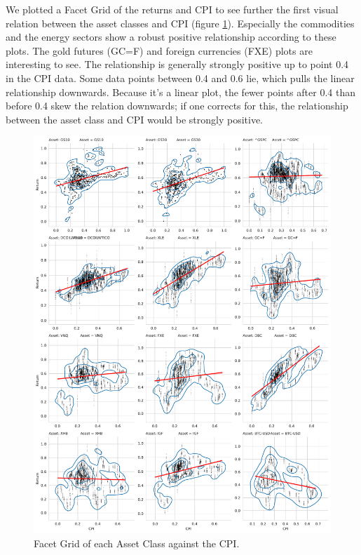 \documentclass{article}
\begin{document}
We plotted a Facet Grid of the returns and CPI to see further the first visual relation between the asset classes and CPI (figure \ref{fig:mesh6}). Especially the commodities and the energy sectors show a robust positive relationship according to these plots. The gold futures (GC=F) and foreign currencies (FXE) plots are interesting to see. The relationship is generally strongly positive up to point 0.4 in the CPI data. Some data points between 0.4 and 0.6 lie, which pulls the linear relationship downwards. Because it's a linear plot, the fewer points after 0.4 than before 0.4 skew the relation downwards; if one corrects for this, the relationship between the asset class and CPI would be strongly positive.

\begin{figure}[H]
    \centering
    \includegraphics[width=1\textwidth]{paper/figure/CPI_Returns.pdf}
    \caption{Facet Grid of each Asset Class against the CPI.}
    \label{fig:mesh6}
\end{figure}
\end{document}
